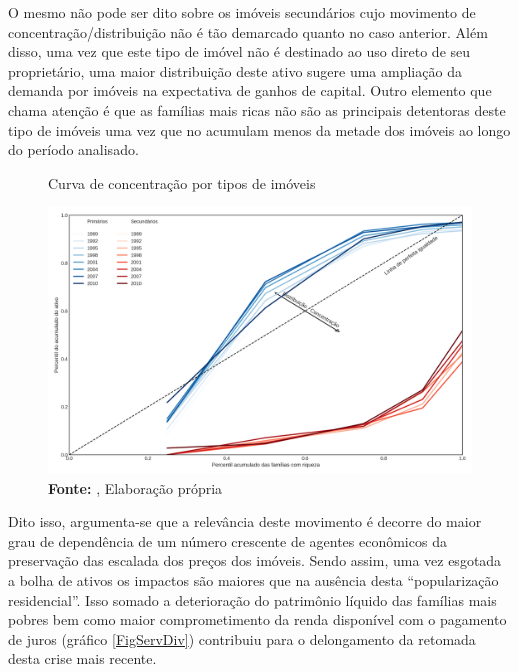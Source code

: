 
O mesmo não pode ser dito sobre os imóveis secundários cujo movimento de concentração/distribuição não é tão demarcado quanto no caso anterior.
Além disso, uma vez que este tipo de imóvel não é destinado ao uso direto de seu proprietário, uma maior distribuição deste ativo sugere uma ampliação da demanda por imóveis na expectativa de ganhos de capital.
Outro elemento que chama atenção é que as famílias mais ricas não são as principais detentoras deste tipo de imóveis uma vez que no acumulam menos da metade dos imóveis ao longo do período analisado.




\begin{figure}[H]
	\centering
	\caption{Curva de concentração por tipos de imóveis}
	\label{FigConcentracao}
	\includegraphics[width=\textwidth]{../../Dados/Fatos_Estilizados/figs/Concentracao_Imoveis.png}
	\caption*{\textbf{Fonte:} \textcite{us_census_bureau_characteristics_2017}, Elaboração própria}
\end{figure}

Dito isso, argumenta-se que a relevância deste movimento é decorre do maior grau de dependência de um número crescente de agentes econômicos da preservação das escalada dos preços dos imóveis.
Sendo assim, uma vez esgotada a bolha de ativos os impactos são maiores que na ausência desta ``popularização residencial''.
Isso somado a deterioração do patrimônio líquido das famílias mais pobres bem como maior comprometimento da renda disponível com o pagamento de juros (gráfico \ref{FigServDiv}) contribuiu para o delongamento da retomada desta crise mais recente.

